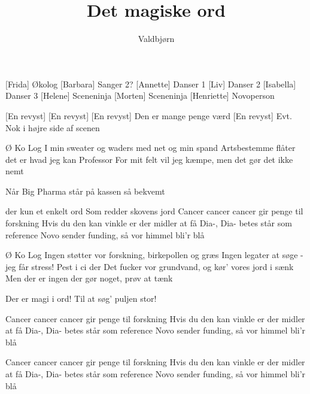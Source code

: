 \documentclass[a4paper,11pt]{article}
\title{Det magiske ord}
\author{Valdbjørn}
\begin{document}
\maketitle

\begin{roles}
  [Frida] Økolog
  [Barbara] Sanger 2?
  [Annette] Danser 1
  [Liv] Danser 2
  [Isabella] Danser 3
  [Helene] Sceneninja
  [Morten] Sceneninja
  [Henriette] Novoperson
\end{roles}

\begin{props}
    [En revyst]
    [En revyst]
    [En revyst] Den er mange penge værd
    [En revyst] Evt. Nok i højre side af scenen
\end{props}

\begin{center}
\end{center} 

\begin{song}
   Ø Ko Log
I min sweater og waders med net og min spand
Artsbestemme flåter det er hvad jeg kan
Professor
For mit felt vil jeg kæmpe, men det gør det ikke nemt


Når Big Pharma står på kassen så bekvemt


der kun et enkelt ord
Som redder skovens jord
Cancer cancer cancer gir penge til forskning
Hvis du den kan vinkle er der midler at få
Dia-, Dia- betes står som reference
Novo sender funding, så vor himmel bli’r blå


Ø Ko Log
Ingen støtter vor forskning, birkepollen og græs
Ingen legater at søge - jeg får stress!
Pest i ci der
Det fucker vor grundvand, og kør’ vores jord i sænk
Men der er ingen der gør noget, prøv at tænk


Der er magi i ord!
Til at søg’ puljen stor!


Cancer cancer cancer gir penge til forskning
Hvis du den kan vinkle er der midler at få
Dia-, Dia- betes står som reference
Novo sender funding, så vor himmel bli’r blå


Cancer cancer cancer gir penge til forskning
Hvis du den kan vinkle er der midler at få
Dia-, Dia- betes står som reference
Novo sender funding, så vor himmel bli’r blå
\end{song}
\end{document}
